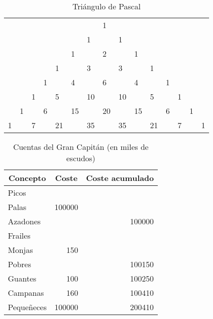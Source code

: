 \documentclass{article}
\begin{document}
\begin{table}
\centering
\begin{tabular}{lllllllllllllll}
 &  &  &  &  &  &  & 1 &  &  &  &  &  &  &  \\
 &  &  &  &  &  & 1 &  & 1 &  &  &  &  &  &  \\
 &  &  &  &  & 1 &  & 2 &  & 1 &  &  &  &  &  \\
 &  &  &  & 1 &  & 3 &  & 3 &  & 1 &  &  &  &  \\
 &  &  & 1 &  & 4 &  & 6 &  & 4 &  & 1 &  &  &  \\
 &  & 1 &  & 5 &  & 10 &  & 10 &  & 5 &  & 1 &  &  \\
 & 1 &  & 6 &  & 15 &  & 20 &  & 15 &  & 6 &  & 1 &  \\
1 &  & 7 &  & 21 &  & 35 &  & 35 &  & 21 &  & 7 &  & 1
\end{tabular}
\caption{Triángulo de Pascal}
\label{tab:pascal}
\end{table}



\begin{table}
\centering
\begin{tabular}{|l|r|r|}
\hline
\multicolumn{1}{|c|}{\textbf{Concepto}} & \multicolumn{1}{c|}{\textbf{Coste}} & \multicolumn{1}{c|}{\textbf{Coste acumulado}} \\ \hline
Picos &  &  \\ \cline{3-3} 
Palas & 100000 &  \\ \cline{3-3} 
Azadones &  & 100000 \\ \hline
Frailes &  &  \\ \cline{3-3} 
Monjas & 150 &  \\ \cline{3-3} 
Pobres &  & 100150 \\ \hline
Guantes & 100 & 100250 \\ \hline
Campanas & 160 & 100410 \\ \hline
Pequeñeces & 100000 & 200410 \\ \hline
\end{tabular}
\caption{Cuentas del Gran Capitán (en miles de escudos)}
\label{tab:gcap}
\end{table}
\end{document}
